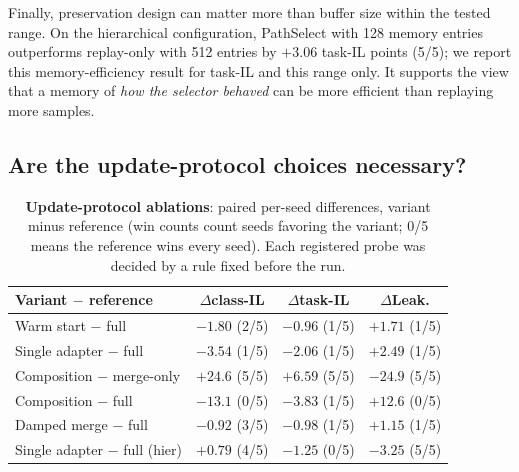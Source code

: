 \documentclass{article}
\begin{document}
Finally, preservation design can matter more than buffer size within the tested range.
On the hierarchical configuration, PathSelect with 128 memory entries outperforms replay-only with 512 entries by $+3.06$ task-IL points (5/5); we report this memory-efficiency result for task-IL and this range only.
It supports the view that a memory of \emph{how the selector behaved} can be more efficient than replaying more samples.


\subsection{Are the update-protocol choices necessary?}
\label{ssec:protocols}

\begin{table}[t]
\centering\footnotesize
\caption{\textbf{Update-protocol ablations}: paired per-seed differences, variant minus reference (win counts count seeds favoring the variant; 0/5 means the reference wins every seed). Each registered probe was decided by a rule fixed before the run.}
\label{tab:abl}
\begin{tabular}{lccc}
\toprule
Variant $-$ reference & $\Delta$class-IL & $\Delta$task-IL & $\Delta$Leak. \\
\midrule
Warm start $-$ full & $-1.80$ (2/5) & $-0.96$ (1/5) & $+1.71$ (1/5) \\
Single adapter $-$ full & $-3.54$ (1/5) & $-2.06$ (1/5) & $+2.49$ (1/5) \\
Composition $-$ merge-only & $+24.6$ (5/5) & $+6.59$ (5/5) & $-24.9$ (5/5) \\
Composition $-$ full & $-13.1$ (0/5) & $-3.83$ (1/5) & $+12.6$ (0/5) \\
Damped merge $-$ full & $-0.92$ (3/5) & $-0.98$ (1/5) & $+1.15$ (1/5) \\
Single adapter $-$ full (hier) & $+0.79$ (4/5) & $-1.25$ (0/5) & $-3.25$ (5/5) \\
\bottomrule
\end{tabular}
\end{table}
\end{document}
